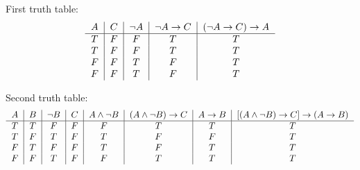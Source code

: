 \documentclass{article}
\begin{document}
    First truth table:
    \begin{equation}
        \begin{tabular}{ c|c|c|c|c }
            $A$ & $C$ & $\neg A$ & $\neg A \rightarrow C$ & $(\neg A \rightarrow C) \rightarrow A$ \\
            \hline
            $T$ & $F$ & $F$ & $T$ & $T$ \\
            $T$ & $F$ & $F$ & $T$ & $T$ \\
            $F$ & $F$ & $T$ & $F$ & $T$ \\
            $F$ & $F$ & $T$ & $F$ & $T$ \\
        \end{tabular}
    \end{equation}

    Second truth table:
    \begin{equation}
        \begin{tabular}{ c|c|c|c|c|c|c|c }
            $A$ & $B$ & $\neg B$ & $C$ & $A \wedge\neg B$ & $(A \wedge\neg B) \rightarrow C$ & $A \rightarrow B$ & $[(A \wedge\neg B) \rightarrow C] \rightarrow (A \rightarrow B)$\\
            \hline
            $T$ & $T$ & $F$ & $F$ & $F$ & $T$ & $T$ & $T$ \\
            $T$ & $F$ & $T$ & $F$ & $T$ & $F$ & $F$ & $T$ \\
            $F$ & $T$ & $F$ & $F$ & $T$ & $F$ & $T$ & $T$ \\
            $F$ & $F$ & $T$ & $F$ & $F$ & $T$ & $T$ & $T$ \\
        \end{tabular}
    \end{equation}
\end{document}
